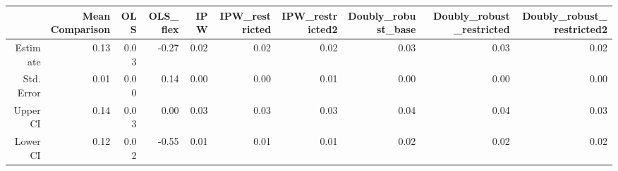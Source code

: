 \begin{table}[ht]
\centering
\begin{tabular}{rrrrrrrrrr}
  \hline
 & Mean Comparison & OLS & OLS\_flex & IPW & IPW\_restricted & IPW\_restricted2 & Doubly\_robust\_base & Doubly\_robust\_restricted & Doubly\_robust\_restricted2 \\ 
  \hline
Estimate & 0.13 & 0.03 & -0.27 & 0.02 & 0.02 & 0.02 & 0.03 & 0.03 & 0.02 \\ 
  Std. Error & 0.01 & 0.00 & 0.14 & 0.00 & 0.00 & 0.01 & 0.00 & 0.00 & 0.00 \\ 
  Upper CI & 0.14 & 0.03 & 0.00 & 0.03 & 0.03 & 0.03 & 0.04 & 0.04 & 0.03 \\ 
  Lower CI & 0.12 & 0.02 & -0.55 & 0.01 & 0.01 & 0.01 & 0.02 & 0.02 & 0.02 \\ 
   \hline
\end{tabular}
\end{table}
